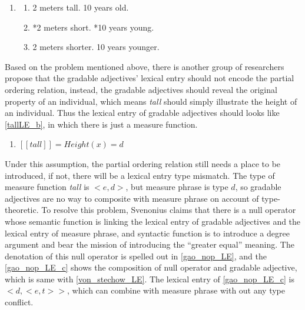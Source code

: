 \documentclass{ctexart}
\let \cite \parencite
\begin{document}
\begin{enumerate}

    \item \label{old_school_def_problem}
    
    \begin{enumerate}
        
        \item 2 meters tall. 10 years old.
        \item *2 meters short. *10 years young.
        \item \label{old_school_def_problem_correct} 2 meters shorter. 10 years younger.

    \end{enumerate}

\end{enumerate}

Based on the problem mentioned above, there is another group of researchers propose that the gradable adjectives' lexical entry should not encode the partial ordering relation, instead, the gradable adjectives should reveal the original property of an individual, which means \textit{tall} should simply illustrate the height of an individual. Thus the lexical entry of gradable adjectives should looks like \ref{tallLE_b}, in which there is just a measure function. 

\begin{enumerate}
    \item \label{tallLE_b} 
    $[\![tall]\!]=Height(x)=d$
\end{enumerate}

Under this assumption, the partial ordering relation still needs a place to be introduced, if not, there will be a lexical entry type mismatch. The type of measure function \textit{tall} is $<e,d>$, but measure phrase is type $d$, so gradable adjectives are no way to composite with measure phrase on account of type-theoretic. To resolve this problem, Svenonius \cite{svenonius2006} claims that there is a null operator whose semantic function is linking the lexical entry of gradable adjectives and the lexical entry of measure phrase, and syntactic function is to introduce a degree argument and bear the mission of introducing the ``greater equal'' meaning. The denotation of this null operator is spelled out in \ref{gao_nop_LE}, and the \ref{gao_nop_LE_c} shows the composition of null operator and gradable adjective, which is same with \ref{von_stechow_LE}. The lexical entry of \ref{gao_nop_LE_c} is $<d,<e,t>>$, which can combine with measure phrase with out any type conflict.
\end{document}
